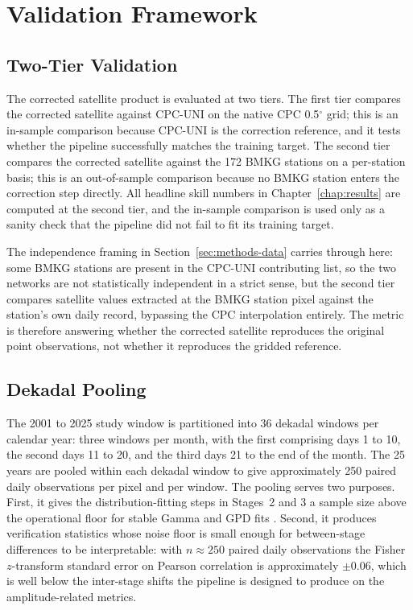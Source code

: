 \section{Validation Framework}\label{sec:methods-validation}

\subsection{Two-Tier Validation}

The corrected satellite product is evaluated at two tiers. The
first tier compares the corrected satellite against CPC-UNI on
the native CPC 0.5$^{\circ}$ grid; this is an in-sample comparison
because CPC-UNI is the correction reference, and it tests
whether the pipeline successfully matches the training target.
The second tier compares the corrected satellite against the 172
BMKG stations on a per-station basis; this is an out-of-sample
comparison because no BMKG station enters the correction step
directly. All headline skill numbers in Chapter~\ref{chap:results}
are computed at the second tier, and the in-sample comparison
is used only as a sanity check that the pipeline did not fail to
fit its training target.

The independence framing in Section~\ref{sec:methods-data} carries
through here: some BMKG stations are present in the CPC-UNI
contributing list, so the two networks are not statistically
independent in a strict sense, but the second tier compares
satellite values extracted at the BMKG station pixel against the
station's own daily record, bypassing the CPC interpolation
entirely. The metric is therefore answering whether the
corrected satellite reproduces the original point observations,
not whether it reproduces the gridded reference.

\subsection{Dekadal Pooling}

The 2001 to 2025 study window is partitioned into 36 dekadal
windows per calendar year: three windows per month, with the
first comprising days 1 to 10, the second days 11 to 20, and
the third days 21 to the end of the month. The 25 years are
pooled within each dekadal window to give approximately 250
paired daily observations per pixel and per window. The
pooling serves two purposes. First, it gives the
distribution-fitting steps in Stages~2 and 3 a sample size
above the operational floor for stable Gamma and GPD fits
\citep{ref:hoskingwallis1997, ref:wilks2020}. Second, it produces
verification statistics whose noise floor is small enough for
between-stage differences to be interpretable: with $n \approx
250$ paired daily observations the Fisher $z$-transform standard
error on Pearson correlation is approximately $\pm 0.06$, which
is well below the inter-stage shifts the pipeline is designed to
produce on the amplitude-related metrics.

